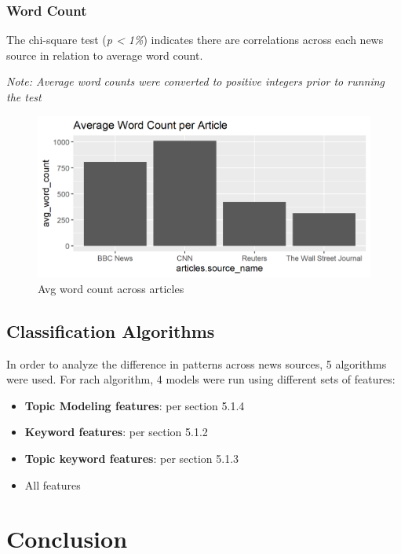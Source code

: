 \documentclass[
]{article}
\begin{document}
\hypertarget{word-count}{%
\subsubsection{Word Count}\label{word-count}}

The chi-square test (\emph{p \textless{} 1\%}) indicates there are
correlations across each news source in relation to average word count.

\emph{Note: Average word counts were converted to positive integers
prior to running the test}

\begin{figure}
\centering
\includegraphics{../figures/avg_word_count.png}
\caption{Avg word count across articles}
\end{figure}

\hypertarget{classification-algorithms}{%
\subsection{Classification Algorithms}\label{classification-algorithms}}

In order to analyze the difference in patterns across news sources, 5
algorithms were used. For rach algorithm, 4 models were run using
different sets of features:

\begin{itemize}
\item
  \textbf{Topic Modeling features}: per section 5.1.4
\item
  \textbf{Keyword features}: per section 5.1.2
\item
  \textbf{Topic keyword features}: per section 5.1.3
\item
  All features
\end{itemize}

\hypertarget{conclusion}{%
\section{Conclusion}\label{conclusion}}
\end{document}
